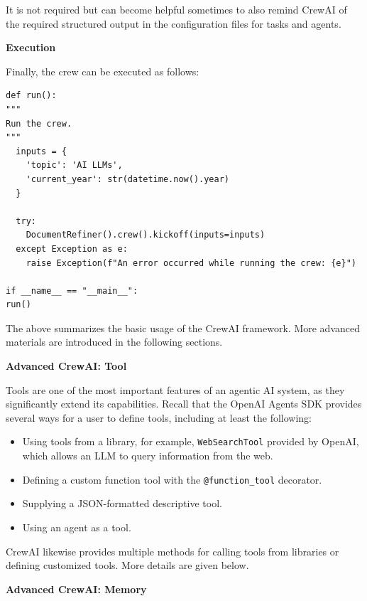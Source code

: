 It is not required but can become helpful sometimes to also remind CrewAI of the required structured output in the configuration files for tasks and agents.

\vspace{0.1in}
\noindent \textbf{Execution}
\vspace{0.1in}

Finally, the crew can be executed as follows:
\begin{lstlisting}
def run():
"""
Run the crew.
"""
  inputs = {
	'topic': 'AI LLMs',
	'current_year': str(datetime.now().year)
  }

  try:
    DocumentRefiner().crew().kickoff(inputs=inputs)
  except Exception as e:
    raise Exception(f"An error occurred while running the crew: {e}")

if __name__ == "__main__":
run()
\end{lstlisting}

The above summarizes the basic usage of the CrewAI framework. More advanced materials are introduced in the following sections.

\vspace{0.1in}
\noindent \textbf{Advanced CrewAI: Tool}
\vspace{0.1in}

Tools are one of the most important features of an agentic AI system, as they significantly extend its capabilities. Recall that the OpenAI Agents SDK provides several ways for a user to define tools, including at least the following:
\begin{itemize}
	\item Using tools from a library, for example, \verb|WebSearchTool| provided by OpenAI, which allows an LLM to query information from the web.
	\item Defining a custom function tool with the \verb|@function_tool| decorator.
	\item Supplying a JSON-formatted descriptive tool.
	\item Using an agent as a tool.
\end{itemize}

CrewAI likewise provides multiple methods for calling tools from libraries or defining customized tools. More details are given below.












\vspace{0.1in}
\noindent \textbf{Advanced CrewAI: Memory}
\vspace{0.1in}


